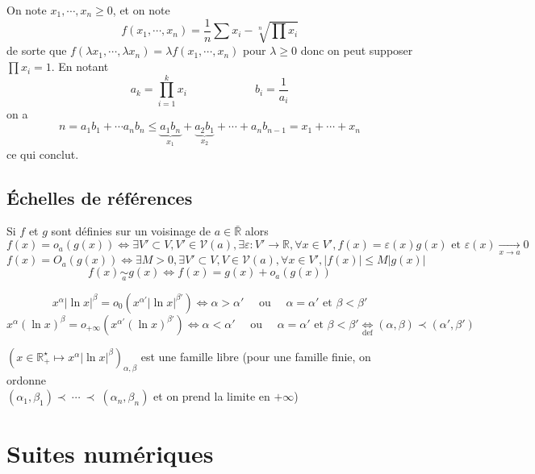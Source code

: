 \begin{ex}[Inégalité AM-GM]
    On note $x_1, \cdots, x_n\geq 0$, et on note \[
        f(x_1, \cdots, x_n)=\frac1n\sum x_i-\sqrt[n]{\prod x_i}
    \]
    de sorte que $f(\lambda x_1, \cdots, \lambda x_n)=\lambda f(x_1, \cdots, x_n)$ pour $\lambda\geq 0$ donc on peut supposer $\prod x_i=1$. En notant \[
        a_k=\prod_{i=1}^kx_i\qquad\qquad\qquad b_i=\frac1{a_i}
    \]
    on a \[
        n=a_1b_1+\cdots a_nb_n\leq \underbrace{a_1b_n}_{x_1}+\underbrace{a_2b_1}_{x_2}+\cdots + a_nb_{n-1}=x_1+\cdots+x_n
    \]
    ce qui conclut.
\end{ex}

\subsection{Échelles de références}

\begin{dfn}[Rappels]
    Si $f$ et $g$ sont définies sur un voisinage de $a\in\bar{\mathbb R}$ alors \[
        f(x)=o_a(g(x))\iff \exists V'\subset V, V'\in\mathcal V(a), \exists \varepsilon:V'\to\mathbb R, \forall x\in V', f(x)=\varepsilon(x)g(x)\text{ et }\varepsilon(x)\xrightarrow[x\to a]{}0
    \]
    \[
        f(x)=O_a(g(x))\iff \exists M>0, \exists V'\subset V, V\in\mathcal V(a), \forall x\in V', |f(x)|\leq M|g(x)|
    \]
    \[
        f(x)\underset a\sim g(x)\iff f(x)=g(x)+o_a(g(x))
    \]
\end{dfn}

\begin{ex}
    \[ x^\alpha|\ln x|^\beta=o_0(x^{\alpha'}|\ln x|^{\beta'})\iff \alpha>\alpha'\quad \text{ ou }\quad \alpha=\alpha'\text{ et }\beta<\beta'\]
    \[x^\alpha (\ln x)^\beta=o_{+\infty}(x^{\alpha'}(\ln x)^{\beta'})\iff \alpha<\alpha'\quad\text{ ou }\quad \alpha=\alpha'\text{ et }\beta<\beta'\underset{\text{def}}\iff (\alpha, \beta)\prec (\alpha', \beta')\]
\end{ex}

\begin{csq}
    $(x\in\mathbb R_+^\star\longmapsto x^\alpha |\ln x|^\beta)_{\alpha,\beta}$ est une famille libre (pour une famille finie, on ordonne \\$(\alpha_1, \beta_1)\prec~\cdots~\prec~(\alpha_n,\beta_n)$ et on prend la limite en $+\infty$)
\end{csq}

\section{Suites numériques}

